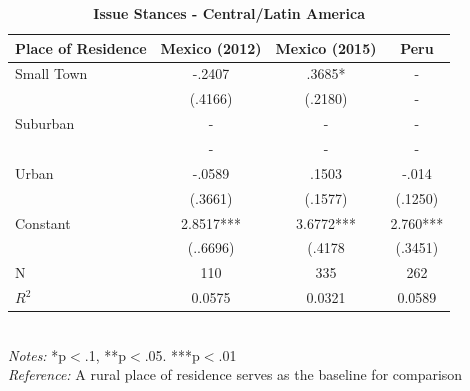 \documentclass[12pt, titlepage]{article}
\newcommand\e{\emph}
\newcommand\tb{\textbf}
\begin{document}
\begin{singlespace}
	\begin{table}[H]
		\centering
		\caption{\tb{Issue Stances - Central/Latin America}}
		\begin{tabulary}{\linewidth}{l c c c}
			
			\hline
			\tb{Place of Residence}&\tb{Mexico (2012)}&\tb{Mexico (2015)} &\tb{Peru}\\
			\hline
			Small Town&-.2407 & .3685*& - \\
			&(.4166)  & (.2180)&-\\
			Suburban&- &- &-\\
			& -  & -&-\\
			Urban &-.0589 & .1503&-.014\\
			&(.3661) & (.1577)&(.1250)\\
			Constant& 2.8517*** &3.6772***&2.760*** \\
			& (..6696)  & (.4178&(.3451)\\
			N&110 & 335&262\\
			$R^2$&0.0575 & 0.0321&0.0589 \\
			\hline 
		\end{tabulary}
		\\
		\e{Notes:} *p$<$.1, **p$<$.05. ***p$<$.01 \\
		\e{Reference:} A rural place of residence serves as the baseline for comparison
		\label{CentAmerLib}
	\end{table}
\end{singlespace}
\end{document}
